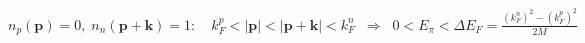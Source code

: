 \documentclass[border=2pt]{standalone}
\begin{document}
$\displaystyle n_p(\mathbf p)=0,\;n_n(\mathbf p+\mathbf k)=1:\quad k_F^p<|\mathbf p|<|\mathbf p+\mathbf k|<k_F^n\;\;\Longrightarrow\;\;0<E_\pi<\Delta E_F=\frac{(k_F^n)^2-(k_F^p)^2}{2M}$
\end{document}
